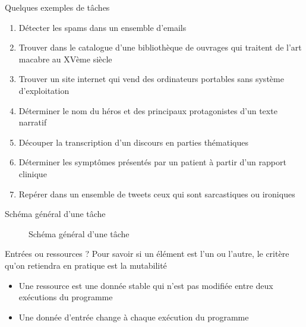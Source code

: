 \documentclass[hyperref={unicode}, xcolor={svgnames}, french]{beamer}
\begin{document}
\begin{frame}{Quelques exemples de tâches}
    \begin{enumerate}
        \item Détecter les spams dans un ensemble d'emails
        \item Trouver dans le catalogue d'une bibliothèque de ouvrages qui traitent de l'art macabre au XVème siècle
        \item Trouver un site internet qui vend des ordinateurs portables sans système d'exploitation
        \item Déterminer le nom du héros et des principaux protagonistes d'un texte narratif
        \item Découper la transcription d'un discours en parties thématiques
        \item Déterminer les symptômes présentés par un patient à partir d'un rapport clinique
        \item Repérer dans un ensemble de tweets ceux qui sont sarcastiques ou ironiques
    \end{enumerate}
\end{frame}

\begin{frame}[fragile]{Schéma général d'une tâche}
    \begin{figure}
        \tikzset{external/export=true}
        \caption{Schéma général d'une tâche}
    \end{figure}
\end{frame}

\begin{frame}{Entrées ou ressources ?}
    Pour savoir si un élément est l'un ou l'autre, le critère qu'on retiendra en pratique est la \alert{mutabilité}
    \begin{itemize}
        \item Une ressource est une donnée \alert{stable} qui n'est pas modifiée entre deux exécutions du programme
        \item Une donnée d'entrée \alert{change} à chaque exécution du programme
    \end{itemize}
\end{frame}
\end{document}
